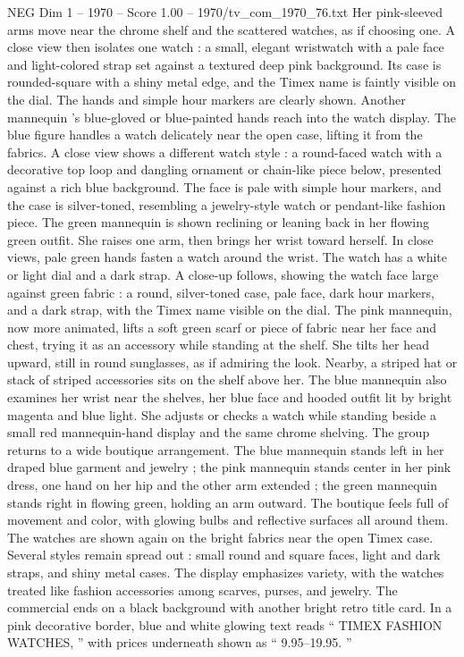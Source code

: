 \begin{textsample}{NEG Dim 1 – 1970 – Score 1.00 – 1970/tv\_com\_1970\_76.txt}
Her pink-sleeved arms move near the chrome shelf and the scattered watches, as if choosing one.
A close view then isolates one watch : a small, elegant wristwatch with a pale face and light-colored strap set against a textured deep pink background.
Its case is rounded-square with a shiny metal edge, and the Timex name is faintly visible on the dial.
The hands and simple hour markers are clearly shown.
Another mannequin ’s blue-gloved or blue-painted hands reach into the watch display.
The blue figure handles a watch delicately near the open case, lifting it from the fabrics.
A close view shows a different watch style : a round-faced watch with a decorative top loop and dangling ornament or chain-like piece below, presented against a rich blue background.
The face is pale with simple hour markers, and the case is silver-toned, resembling a jewelry-style watch or pendant-like fashion piece.
The green mannequin is shown reclining or leaning back in her flowing green outfit.
She raises one arm, then brings her wrist toward herself.
In close views, pale green hands fasten a watch around the wrist.
The watch has a white or light dial and a dark strap.
A close-up follows, showing the watch face large against green fabric : a round, silver-toned case, pale face, dark hour markers, and a dark strap, with the Timex name visible on the dial.
The pink mannequin, now more animated, lifts a soft green scarf or piece of fabric near her face and chest, trying it as an accessory while standing at the shelf.
She tilts her head upward, still in round sunglasses, as if admiring the look.
Nearby, a striped hat or stack of striped accessories sits on the shelf above her.
The blue mannequin also examines her wrist near the shelves, her blue face and hooded outfit lit by bright magenta and blue light.
She adjusts or checks a watch while standing beside a small red mannequin-hand display and the same chrome shelving.
The group returns to a wide boutique arrangement.
The blue mannequin stands left in her draped blue garment and jewelry ; the pink mannequin stands center in her pink dress, one hand on her hip and the other arm extended ; the green mannequin stands right in flowing green, holding an arm outward.
The boutique feels full of movement and color, with glowing bulbs and reflective surfaces all around them.
The watches are shown again on the bright fabrics near the open Timex case.
Several styles remain spread out : small round and square faces, light and dark straps, and shiny metal cases.
The display emphasizes variety, with the watches treated like fashion accessories among scarves, purses, and jewelry.
The commercial ends on a black background with another bright retro title card.
In a pink decorative border, blue and white glowing text reads “ TIMEX FASHION WATCHES, ” with prices underneath shown as “ 9.95–19.95. ”

\end{textsample}
